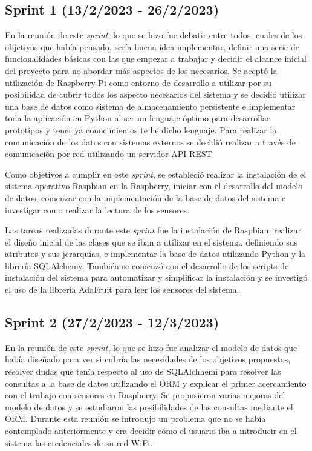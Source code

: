 \subsection{Sprint 1 (13/2/2023 - 26/2/2023)}

En la reunión de este \textit{sprint}, lo que se hizo fue debatir entre todos, cuales de los objetivos que había pensado, sería buena idea implementar, definir una serie de funcionalidades básicas con las que empezar a trabajar y decidir  el alcance inicial del proyecto para no abordar más aspectos de los necesarios. Se aceptó la utilización de Raspberry Pi como entorno de desarrollo a utilizar por su posibilidad de cubrir todos los aspecto necesarios del sistema y se decidió utilizar una base de datos como sistema de almacenamiento persistente e implementar toda la aplicación en Python al ser un lenguaje óptimo para desarrollar prototipos y tener ya conocimientos te he dicho lenguaje. Para realizar la comunicación de los datos con sistemas externos se decidió realizar a través de comunicación por red utilizando un servidor API REST 

Como objetivos a cumplir en este \textit{sprint}, se estableció realizar la instalación de el sistema operativo Raspbian en la Raspberry, iniciar con el desarrollo del modelo de datos, comenzar con la implementación de la base de datos del sistema e investigar como realizar la lectura de los sensores.

Las tareas realizadas durante este \textit{sprint} fue la instalación de Raspbian, realizar el diseño inicial de las clases que se iban a utilizar en el sistema, definiendo sus atributos y sus jerarquías, e implementar la base de datos utilizando Python y la librería SQLAlchemy. También se comenzó con el desarrollo de los scripts de instalación del sistema para automatizar y simplificar la instalación y se investigó el uso de la librería AdaFruit para leer los sensores del sistema.

\subsection{Sprint 2 (27/2/2023 - 12/3/2023)}
En la reunión de este \textit{sprint}, lo que se hizo fue analizar el modelo de datos que había diseñado para ver si cubría las necesidades de los objetivos propuestos, resolver dudas que tenía respecto al uso de SQLAlchhemi para resolver las consultas a la base de datos utilizando el ORM y explicar el primer acercamiento con el trabajo con sensores en Raspberry. Se propusieron varias mejoras del modelo de datos y se estudiaron las posibilidades de las consultas mediante el ORM. Durante esta reunión se introdujo un problema que no se había contemplado anteriormente y era decidir cómo el usuario iba a introducir en el sistema las credenciales de su red WiFi.

